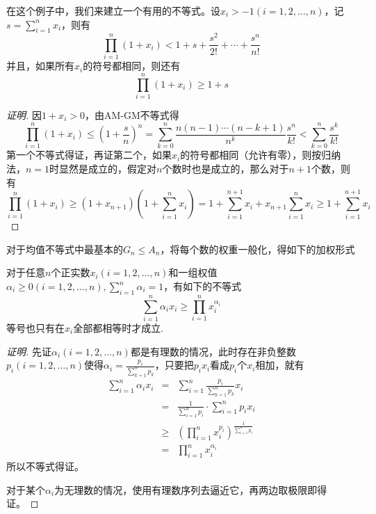 \begin{example}
  在这个例子中，我们来建立一个有用的不等式。设$x_i > -1(i=1,2,\ldots,n)$，记$s=\sum_{i=1}^nx_i$，则有
  \[ \prod_{i=1}^n(1+x_i) < 1+s+\frac{s^2}{2!}+\cdots+\frac{s^n}{n!} \]
  并且，如果所有$x_i$的符号都相同，则还有
  \[ \prod_{i=1}^n(1+x_i) \geqslant 1+s \]
  \begin{proof}[证明]
    因$1+x_i>0$，由AM-GM不等式得
    \[ \prod_{i=1}^n(1+x_i) \leqslant \left( 1+\frac{s}{n} \right)^n = \sum_{k=0}^n \frac{n(n-1)\cdots(n-k+1)}{n^k} \frac{s^n}{k!} < \sum_{k=0}^n \frac{s^k}{k!}  \]
    第一个不等式得证，再证第二个，如果$x_i$的符号都相同（允许有零），则按归纳法，$n=1$时显然是成立的，假定对$n$个数时也是成立的，那么对于$n+1$个数，则有
    \[ \prod_{i=1}^n (1+x_i) \geqslant (1+x_{n+1})(1+\sum_{i=1}^nx_i) = 1+\sum_{i=1}^{n+1}x_i + x_{n+1}\sum_{i=1}^nx_i \geqslant 1+\sum_{i=1}^{n+1}x_i \]
  \end{proof}
\end{example}

对于均值不等式中最基本的$G_n\leqslant A_n$，将每个数的权重一般化，得如下的加权形式
\begin{theorem}[加权平均值不等式]
  对于任意$n$个正实数$x_{i}(i=1,2,\ldots,n)$和一组权值$\alpha_i\geqslant 0(i=1,2,\ldots,n),\sum_{i=1}^n\alpha_i=1$，有如下的不等式
  \begin{equation}
    \label{eq:mean-inequation-with-weight}
    \sum_{i=1}^n\alpha_ix_i \geqslant \prod_{i=1}^nx_i^{\alpha_i}
  \end{equation}
  等号也只有在$x_i$全部都相等时才成立.
\end{theorem}
\begin{proof}[证明]
  先证$\alpha_i(i=1,2,\ldots,n)$都是有理数的情况，此时存在非负整数$p_i(i=1,2,\ldots,n)$使得$\alpha_i=\frac{p_i}{\sum_{k=1}^np_k}$，只要把$p_ix_i$看成$p_i$个$x_i$相加，就有
  \begin{eqnarray*}
    \sum_{i=1}^n\alpha_ix_i &=& \sum_{i=1}^n \frac{p_i}{\sum_{k=1}^np_k}x_i \\
                            &=& \frac{1}{\sum_{i=1}^np_i} \cdot \sum_{i=1}^np_ix_i \\
                            & \geqslant & \left (\prod_{i=1}^nx_i^{p_i} \right)^{\frac{1}{\sum_{i=1}^n p_i}} \\
    & = & \prod_{i=1}^n x_i^{\alpha_i}
  \end{eqnarray*}
  所以不等式得证。

  对于某个$\alpha_i$为无理数的情况，使用有理数序列去逼近它，再两边取极限即得证。
\end{proof}

